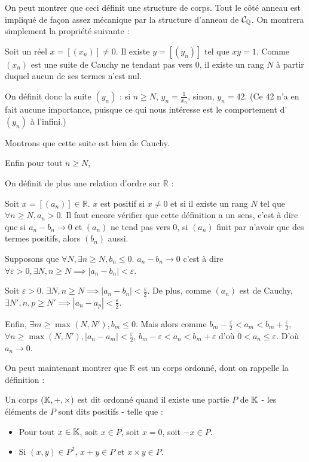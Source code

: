 On peut montrer que ceci définit une structure de corps. Tout le côté anneau est impliqué de façon assez mécanique par la structure d'anneau de $\mathcal{C}_{\mathbb{Q}}$. On montrera simplement la propriété suivante :
\begin{prop}
    Soit un réel $x = [(x_n) ]\neq 0$. Il existe $y=[(y_n)]$ tel que $xy=1$.
    \tcblower
    Comme $(x_n)$ est une suite de Cauchy ne tendant pas vers 0, il existe un rang $N$ à partir duquel aucun de ses termes n'est nul. 
    
    On définit donc la suite $(y_n)$ : si $n\geq N$, $y_n = \frac{1}{x_n}$, sinon, $y_n=42$. (Ce 42 n'a en fait aucune importance, puisque ce qui nous intéresse est le comportement d'$(y_n)$ à l'infini.)

    Montrons que cette suite est bien de Cauchy. 
    
    Enfin pour tout $n\geq N$, 
\end{prop}

On définit de plus une relation d'ordre sur $\mathbb{R}$ :
\begin{defini}
Soit $x = [(a_n)] \in \mathbb{R}$. $x$ est positif si $x\neq 0$ et si il existe un rang $N$ tel que $\forall n \geq N, a_n > 0$. 
\tcblower
Il faut encore vérifier que cette définition a un sens, c'est à dire que si $a_n-b_n \to 0$ et $(a_n)$ ne tend pas vers 0, si $(a_n)$ finit par n'avoir que des termes positifs, alors $(b_n)$ aussi. 

Supposons que $\forall N, \exists n \geq N, b_n \leq 0$. $a_n-b_n \to 0$ c'est à dire $\forall \varepsilon >0, \exists N, n \geq N \implies  |a_n-b_n|<\varepsilon$.

Soit $\varepsilon >0$. $\exists N, n \geq N \implies  |a_n-b_n|<\frac{\varepsilon}{2}$. De plus, comme $(a_n)$ est de Cauchy, $\exists N', n, p \geq N' \implies |a_{n}-a_{p}| < \frac{\varepsilon}{2}$.

Enfin, $\exists m \geq \max(N, N'), b_m \leq 0$.  Mais alors comme $b_{m}- \frac{\varepsilon}{2}<a_m<b_{m}+ \frac{\varepsilon}{2}$, $\forall n \geq \max(N, N'), |a_n-a_m|< \frac{\varepsilon}{2}$, $b_m-\varepsilon<a_n<b_m+\varepsilon$ d'où $0<a_n\leq \varepsilon$. D'où $a_n \to 0$. 
\end{defini}

On peut maintenant montrer que $\mathbb{R}$ est un corps ordonné, dont on rappelle la définition :
\begin{defini}
    Un corps $(\mathbb{K}, +, \times)$ est dit ordonné quand il existe une partie $P$ de $\mathbb{K}$ - les éléments de $P$ sont dits positifs - telle que :
    \begin{itemize}
        \item Pour tout $x\in \mathbb{K}$, soit $x\in P$, soit $x=0$, soit $-x\in P$.
        \item Si $(x,y)\in P^2$, $x+y \in P$ et $x\times y \in P$.
    \end{itemize}
\end{defini}

